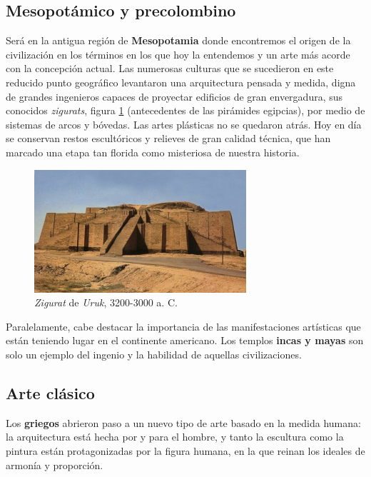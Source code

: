 \subsection{Mesopotámico y precolombino}

Será en la antigua región de \textbf{Mesopotamia} donde encontremos el origen de la civilización en los términos en los que hoy la entendemos y un arte más acorde con la concepción actual. Las numerosas culturas que se sucedieron en este reducido punto geográfico levantaron una arquitectura pensada y medida, digna de grandes ingenieros capaces de proyectar edificios de gran envergadura, sus conocidos \textit{zigurats}, figura \ref{fig:zigurat} (antecedentes de las pirámides egipcias), por medio de sistemas de arcos y bóvedas. Las artes plásticas no se quedaron atrás. Hoy en día se conservan restos escultóricos y relieves de gran calidad técnica, que han marcado una etapa tan florida como misteriosa de nuestra historia.

\begin{figure}[!h]
    \begin{center}
    \includegraphics[width=0.7\textwidth]{imagenes/2/zigurat.jpg}
    \caption{\textit{Zigurat} de \textit{Uruk}, 3200-3000 a. C.}
    \label{fig:zigurat}
    \end{center}
\vspace{-0.4cm}
\end{figure}

Paralelamente, cabe destacar la importancia de las manifestaciones artísticas que están teniendo lugar en el continente americano. Los templos \textbf{incas y mayas} son solo un ejemplo del ingenio y la habilidad de aquellas civilizaciones.

\subsection{Arte clásico}

Los \textbf{griegos} abrieron paso a un nuevo tipo de arte basado en la medida humana: la arquitectura está hecha por y para el hombre, y tanto la escultura como la pintura están protagonizadas por la figura humana, en la que reinan los ideales de armonía y proporción. 

